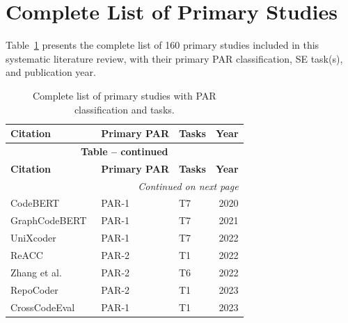 
\section{Complete List of Primary Studies}
\label{appendix:studies}

Table~\ref{tab:primary-studies} presents the complete list of 160 primary studies included in
this systematic literature review, with their primary PAR classification, SE task(s), and
publication year.

\begin{longtable}{p{5cm}p{1.2cm}p{1.5cm}r}
\caption{Complete list of primary studies with PAR classification and tasks.}
\label{tab:primary-studies}\\
\toprule
\textbf{Citation} & \textbf{Primary PAR} & \textbf{Tasks} & \textbf{Year} \\
\midrule
\endfirsthead
\multicolumn{4}{c}{{\bfseries Table \thetable{} -- continued}}\\
\toprule
\textbf{Citation} & \textbf{Primary PAR} & \textbf{Tasks} & \textbf{Year} \\
\midrule
\endhead
\midrule
\multicolumn{4}{r}{\textit{Continued on next page}}\\
\endfoot
\bottomrule
\endlastfoot
CodeBERT~\cite{feng2020codebert}                  & PAR-1 & T7       & 2020 \\
GraphCodeBERT~\cite{guo2021graphcodebert}          & PAR-1 & T7       & 2021 \\
UniXcoder~\cite{guo2022unixcoder}                 & PAR-1 & T7       & 2022 \\
ReACC~\cite{lu2022reacc}                          & PAR-2 & T1       & 2022 \\
Zhang et al.~\cite{zhang2022merge}                & PAR-2 & T6       & 2022 \\
RepoCoder~\cite{zhang2023repocoder}               & PAR-2 & T1       & 2023 \\
CrossCodeEval~\cite{ding2023crosscodeeval}         & PAR-1 & T1       & 2023 \\

\end{longtable}
